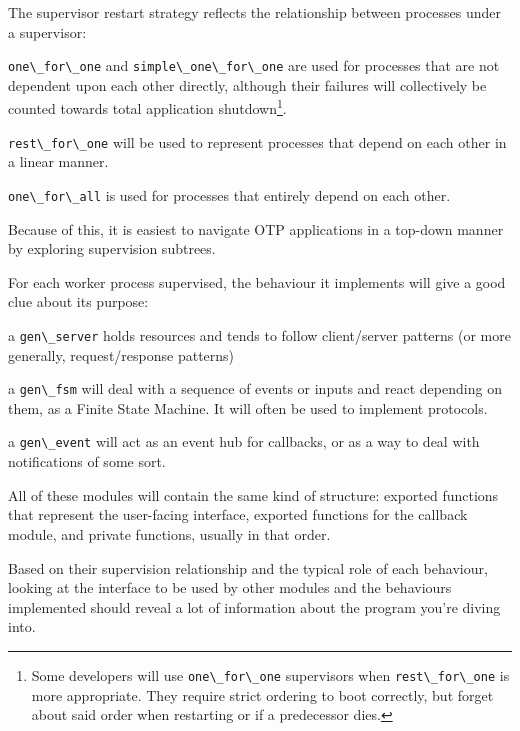 \documentclass[11pt, oneside]{book}   	%
\newcommand{\module}[1]{\Verb`#1`}
\newcommand{\expression}[1]{\Verb`#1`}
\begin{document}
The supervisor restart strategy reflects the relationship between processes under a supervisor:

\begin{itemize*}
	\item \expression{one\_for\_one} and \expression{simple\_one\_for\_one} are used for processes that are not dependent upon each other directly, although their failures will collectively be counted towards total application shutdown\footnote{Some developers will use \expression{one\_for\_one} supervisors when \expression{rest\_for\_one} is more appropriate. They require strict ordering to boot correctly, but forget about said order when restarting or if a predecessor dies.}.
	\item \expression{rest\_for\_one} will be used to represent processes that depend on each other in a linear manner.
	\item \expression{one\_for\_all} is used for processes that entirely depend on each other.
\end{itemize*}

Because of this, it is easiest to navigate OTP applications in a top-down manner by exploring supervision subtrees. 

For each worker process supervised, the behaviour it implements will give a good clue about its purpose:

\begin{itemize*}
	\item a \module{gen\_server} holds resources and tends to follow client/server patterns (or more generally, request/response patterns)
	\item a \module{gen\_fsm} will deal with a sequence of events or inputs and react depending on them, as a Finite State Machine. It will often be used to implement protocols.
	\item a \module{gen\_event} will act as an event hub for callbacks, or as a way to deal with notifications of some sort.
\end{itemize*}

All of these modules will contain the same kind of structure: exported functions that represent the user-facing interface, exported functions for the callback module, and private functions, usually in that order.

Based on their supervision relationship and the typical role of each behaviour, looking at the interface to be used by other modules and the behaviours implemented should reveal a lot of information about the program you're diving into.
\end{document}

